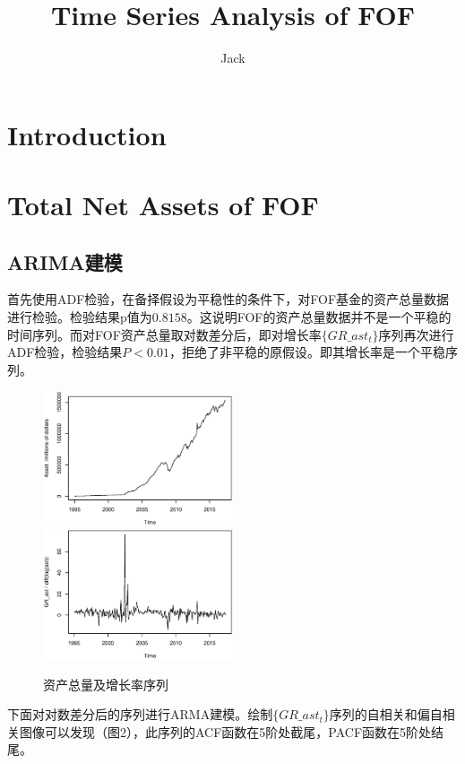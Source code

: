 \documentclass[10pt]{article}
\author{Jack}
\title{Time Series Analysis of FOF}
\begin{document}
\maketitle{}
\section{Introduction}

\section{Total Net Assets of FOF}
\subsection{ARIMA建模}
首先使用ADF检验，在备择假设为平稳性的条件下，对FOF基金的资产总量数据进行检验。检验结果p值为$0.8158$。这说明FOF的资产总量数据并不是一个平稳的时间序列。而对FOF资产总量取对数差分后，即对增长率$\{GR\_ast_t\}$序列再次进行ADF检验，检验结果$P<0.01$，拒绝了非平稳的原假设。即其增长率是一个平稳序列。

\begin{figure}
    \caption{资产总量及增长率序列}
	\includegraphics[width=0.5\textwidth]{pic/ast.eps}
	\includegraphics[width=0.5\textwidth]{pic/gr_ast.eps}
\end{figure}

下面对对数差分后的序列进行ARMA建模。绘制$\{GR\_ast_t\}$序列的自相关和偏自相关图像可以发现（图2），此序列的ACF函数在5阶处截尾，PACF函数在5阶处结尾。
\end{document}

